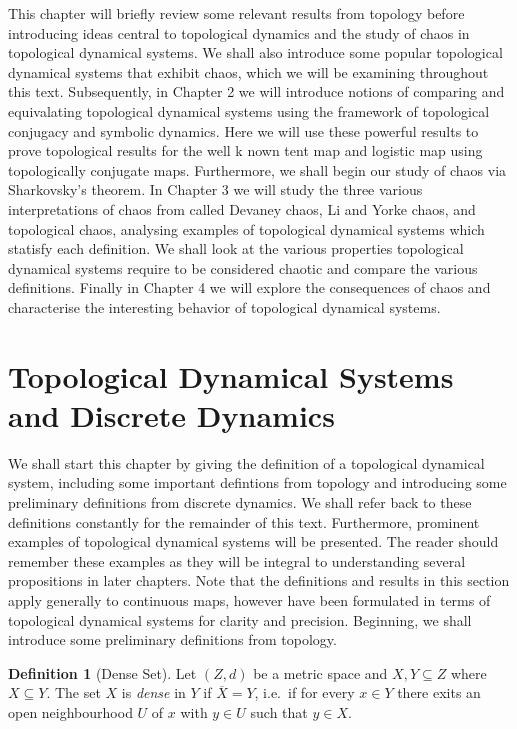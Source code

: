 \documentclass[11pt,a4paper,oneside]{memoir}
\theoremstyle{plain}
\theoremstyle{definition}
\newtheorem{defn}[thm]{Definition}
\begin{document}
This chapter will briefly review some relevant results from topology before introducing ideas central to topological dynamics and the study of chaos in topological dynamical systems. We shall also introduce some popular topological dynamical systems that exhibit chaos, which we will be examining throughout this text. Subsequently, in Chapter 2 we will introduce notions of comparing and equivalating topological dynamical systems using the framework of topological conjugacy and symbolic dynamics. Here we will use these powerful results to prove topological results for the well k   nown tent map and logistic map using topologically conjugate maps. Furthermore, we shall begin our study of chaos via Sharkovsky's theorem. In Chapter 3 we will study the three various interpretations of chaos from called Devaney chaos, Li and Yorke chaos, and topological chaos, analysing examples of topological dynamical systems which statisfy each definition. We shall look at the various properties topological dynamical systems require to be considered chaotic and compare the various definitions. Finally in Chapter 4 we will explore the consequences of chaos and characterise the interesting behavior of topological dynamical systems.

\section{Topological Dynamical Systems and Discrete Dynamics} \label{sec:topological-dynamical-systems}
We shall start this chapter by giving the definition of a topological dynamical system, including some important defintions from topology and introducing some preliminary definitions from discrete dynamics. We shall refer back to these definitions constantly for the remainder of this text. Furthermore, prominent examples of topological dynamical systems will be presented. The reader should remember these examples as they will be integral to understanding several propositions in later chapters. Note that the definitions and results in this section apply generally to continuous maps, however have been formulated in terms of topological dynamical systems for clarity and precision. Beginning, we shall introduce some preliminary definitions from topology.

\begin{defn}[Dense Set] \label{defn:dense}
    Let $(Z, d)$ be a metric space and $X, Y \subseteq Z$ where $X \subseteq Y$. The set $X$ is \emph{dense} in $Y$ if $\overline{X} = Y$, i.e.\ if for every $x \in Y$ there exits an open neighbourhood $U$ of $x$ with $y \in U$ such that $y \in X$.
\end{defn}
\end{document}
